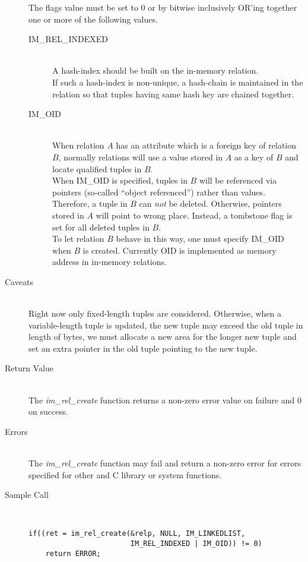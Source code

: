 \begin{description}
  The flags value must be set to 0 or by bitwise inclusively OR'ing
  together one or more of the following values. 
  \begin{description}
  \item[IM\_REL\_INDEXED]\ \\
       A hash-index should be built on the in-memory relation.\\
       If such a hash-index is non-unique, a hash-chain is maintained
       in the relation so that tuples having same hash key are chained
       together.
  \item[IM\_OID]\ \\
       When relation $A$ has an attribute which is a foreign key of
       relation $B$, normally relations will use a value stored in $A$
       as a key of $B$ and locate qualified tuples in $B$.\\
       When IM\_OID is specified, tuples in $B$ will be referenced via
       pointers (so-called ``object referenced'') rather than values.
       Therefore, a tuple in $B$ can {\em not} be deleted. Otherwise,
       pointers stored in $A$ will point to wrong place.  Instead, a
       tombstone flag is set for all deleted tuples in $B$.\\
       To let relation $B$ behave in this way, one must specify
       IM\_OID when $B$ is created.  Currently OID is implemented as
       memory address in in-memory relations.
  \end{description}
\item[Caveats]\ \\
  Right now only fixed-length tuples are considered.  Otherwise, when
  a variable-length tuple is updated, the new tuple may exceed the
  old tuple in length of bytes, we must allocate a new area for the
  longer new tuple and set an extra pointer in the old tuple pointing
  to the new tuple.
\item[Return Value]\ \\
  The {\em im\_rel\_create} function returns a non-zero error value on
  failure and 0 on success.
\item[Errors]\ \\
  The {\em im\_rel\_create} function may fail and return a non-zero
  error for errors specified for other {\IMDB} and C library or system
  functions.
\item[Sample Call]\ 
\begin{verbatim}
if((ret = im_rel_create(&relp, NULL, IM_LINKEDLIST,
                        IM_REL_INDEXED | IM_OID)) != 0)
    return ERROR;
\end{verbatim}
\end{description}

